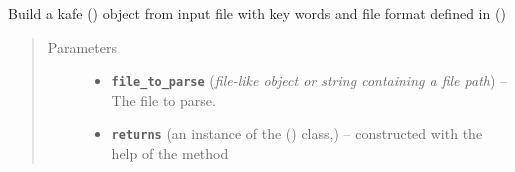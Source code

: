 \documentclass[a4paper,10pt,english]{sphinxmanual}
\begin{document}
\begin{fulllineitems}
\label{index:kafe.file_tools.buildDataset_fromFile}
Build a kafe {\hyperref[index:kafe.dataset.Dataset]{\emph{}}} () object from input file
with key words and file format defined in
{\hyperref[index:kafe.file_tools.parse_general_inputfile]{\emph{}}} ()
\begin{quote}\begin{description}
\item[{Parameters}] \leavevmode\begin{itemize}
\item {} 
\textbf{\texttt{file\_to\_parse}} (\emph{file-like object or string containing a file path}) -- The file to parse.

\item {} 
\textbf{\texttt{returns}} (an instance of the {\hyperref[index:kafe.dataset.Dataset]{\emph{}}} () class,) -- constructed with the help of the method

\end{itemize}

\end{description}\end{quote}

\end{fulllineitems}

\end{document}
